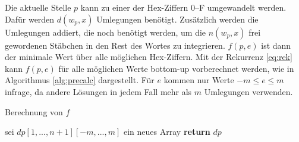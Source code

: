 \documentclass[a4paper,10pt,ngerman]{scrartcl}
\begin{document}
Die aktuelle Stelle $p$ kann zu einer der Hex-Ziffern 0--F umgewandelt werden. Dafür werden $d(w_p, x)$ Umlegungen benötigt. Zusätzlich werden die Umlegungen addiert, die noch benötigt werden, um die $n(w_p, x)$ frei gewordenen Stäbchen in den Rest des Wortes zu integrieren.
$f(p, e)$ ist dann der minimale Wert über alle möglichen Hex-Ziffern. 
Mit der Rekurrenz \ref{eq:rek} kann $f(p, e)$ für alle möglichen Werte bottom-up vorberechnet werden, wie in Algorithmus \ref{alg:precalc} dargestellt. Für $e$ kommen nur Werte $-m \leq e \leq m$ infrage, da andere Lösungen in jedem Fall mehr als $m$ Umlegungen verwenden. 
\begin{algorithm}
\caption{Berechnung von $f$}
\label{alg:precalc}
\begin{algorithmic}[1]
    \State sei $dp[1, ..., n+1][-m, ..., m]$ ein neues Array
        \EndFor 
    \EndFor
    \State \textbf{return} $dp$
\EndProcedure
\end{algorithmic}
\end{algorithm} 
\end{document}
